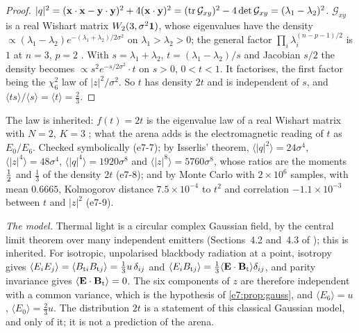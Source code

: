 \begin{proof}
$|q|^2=(\mathbf x\cdot\mathbf x-\mathbf y\cdot\mathbf y)^2+4(\mathbf x\cdot\mathbf y)^2=(\operatorname{tr}\mathcal G_{xy})^2-4\det\mathcal G_{xy}=(\lambda_1-\lambda_2)^2$. $\mathcal G_{xy}$ is a real Wishart
matrix $W_2(3,\sigma^2\mathbf 1)$, whose eigenvalues have the density $\propto(\lambda_1-\lambda_2)e^{-(\lambda_1+\lambda_2)/2\sigma^2}$ on
$\lambda_1>\lambda_2>0$; the general factor $\prod_i\lambda_i^{(n-p-1)/2}$ is $1$ at $n=3$, $p=2$ \cite{Muirhead82}. With $s=\lambda_1+\lambda_2$,
$t=(\lambda_1-\lambda_2)/s$ and Jacobian $s/2$ the density becomes $\propto s^2e^{-s/2\sigma^2}\cdot t$ on $s>0$, $0<t<1$. It factorises, the first
factor being the $\chi^2_6$ law of $|z|^2/\sigma^2$. So $t$ has density $2t$ and is independent of $s$, and
$\langle ts\rangle/\langle s\rangle=\langle t\rangle=\tfrac23$.
\end{proof}

The law is inherited: $f(t)=2t$ is the eigenvalue law of a real Wishart matrix with $N=2$, $K=3$ \cite[eq.~(4.5)]{ZyczkowskiSommers01}; what the arena adds
is the electromagnetic reading of $t$ as $E_0/E_6$. Checked symbolically (e7-7); by Isserlis' theorem, $\langle|q|^2\rangle=24\sigma^4$, $\langle|z|^4\rangle=48\sigma^4$,
$\langle|q|^4\rangle=1920\sigma^8$ and $\langle|z|^8\rangle=5760\sigma^8$, whose ratios are the moments $\tfrac12$ and $\tfrac13$ of the density $2t$
(e7-8); and by Monte Carlo with $2\times10^6$ samples, with mean $0.6665$, Kolmogorov distance $7.5\times10^{-4}$ to $t^2$ and correlation
$-1.1\times10^{-3}$ between $t$ and $|z|^2$ (e7-9).

\emph{The model.} Thermal light is a circular complex Gaussian field, by the central limit theorem over many independent emitters
(Sections~4.2 and~4.3 of \cite{Goodman15}); this is inherited. For isotropic, unpolarised blackbody radiation at a point, isotropy gives
$\langle E_iE_j\rangle=\langle B_{{\rm t}i}B_{{\rm t}j}\rangle=\tfrac13u\,\delta_{ij}$ and $\langle E_iB_{{\rm t}j}\rangle=\tfrac13\langle\mathbf E\cdot\mathbf B_{\rm t}\rangle\delta_{ij}$,
and parity invariance gives $\langle\mathbf E\cdot\mathbf B_{\rm t}\rangle=0$. The six components of $z$ are therefore independent with a common variance, which
is the hypothesis of \cref{e7:prop:gauss}, and $\langle E_6\rangle=u$, $\langle E_0\rangle=\tfrac23u$. The distribution $2t$ is a statement of this
classical Gaussian model, and only of it; it is not a prediction of the arena.


